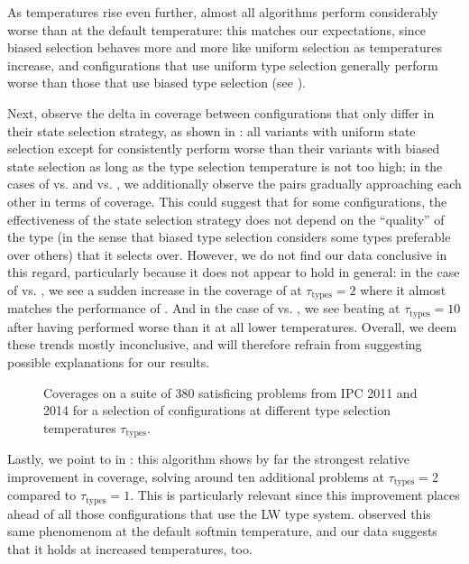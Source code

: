 As temperatures rise even further, almost all algorithms perform considerably worse than at the default temperature: this matches our expectations, since biased selection behaves more and more like uniform selection as temperatures increase, and configurations that use uniform type selection generally perform worse than those that use biased type selection (see ).

Next, observe the delta in coverage between configurations that only differ in their state selection strategy, as shown in : all variants with uniform state selection except for \hiDu consistently perform worse than their variants with biased state selection as long as the type selection temperature is not too high; in the cases of \hiHh vs. \hiHu and \lwHh vs. \lwHu, we additionally observe the pairs gradually approaching each other in terms of coverage. This could suggest that for some configurations, the effectiveness of the state selection strategy does not depend on the ``quality'' of the type (in the sense that biased type selection considers some types preferable over others) that it selects over. However, we do not find our data conclusive in this regard, particularly because it does not appear to hold in general: in the case of \lwDh vs. \lwDu, we see a sudden increase in the coverage of \lwDu at $\tau_\text{types}=2$ where it almost matches the performance of \lwDh. And in the case of \hiDh vs. \hiDu, we see \hiDh beating \hiDu at $\tau_\text{types}=10$ after having performed worse than it at all lower temperatures. Overall, we deem these trends mostly inconclusive, and will therefore refrain from suggesting possible explanations for our results.

\begin{figure}[{{TBLPOS}}]
    \centering
    
    \caption{Coverages on a suite of 380 satisficing problems from IPC 2011 and 2014 for a selection of configurations at different type selection temperatures $\tau_\text{types}$.}
    \label{fig:bttrend}
\end{figure}

Lastly, we point to \hgHu in : this algorithm shows by far the strongest relative improvement in coverage, solving around ten additional problems at $\tau_\text{types}=2$ compared to $\tau_\text{types}=1$. This is particularly relevant since this improvement places \hgHu ahead of all those configurations that use the LW type system.  observed this same phenomenom at the default softmin temperature, and our data suggests that it holds at increased temperatures, too.

